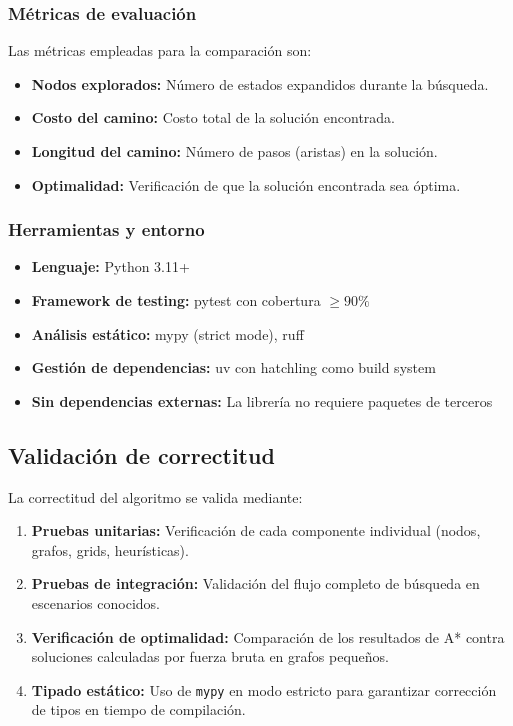 \subsubsection{Métricas de evaluación}

Las métricas empleadas para la comparación son:

\begin{itemize}
    \item \textbf{Nodos explorados:} Número de estados expandidos durante la búsqueda.
    \item \textbf{Costo del camino:} Costo total de la solución encontrada.
    \item \textbf{Longitud del camino:} Número de pasos (aristas) en la solución.
    \item \textbf{Optimalidad:} Verificación de que la solución encontrada sea óptima.
\end{itemize}

\subsubsection{Herramientas y entorno}

\begin{itemize}
    \item \textbf{Lenguaje:} Python 3.11+
    \item \textbf{Framework de testing:} pytest con cobertura $\geq 90\%$
    \item \textbf{Análisis estático:} mypy (strict mode), ruff
    \item \textbf{Gestión de dependencias:} uv con hatchling como build system
    \item \textbf{Sin dependencias externas:} La librería no requiere paquetes de terceros
\end{itemize}

\subsection{Validación de correctitud}

La correctitud del algoritmo se valida mediante:

\begin{enumerate}
    \item \textbf{Pruebas unitarias:} Verificación de cada componente individual (nodos, grafos, grids, heurísticas).
    \item \textbf{Pruebas de integración:} Validación del flujo completo de búsqueda en escenarios conocidos.
    \item \textbf{Verificación de optimalidad:} Comparación de los resultados de A* contra soluciones calculadas por fuerza bruta en grafos pequeños.
    \item \textbf{Tipado estático:} Uso de \texttt{mypy} en modo estricto para garantizar corrección de tipos en tiempo de compilación.
\end{enumerate}
